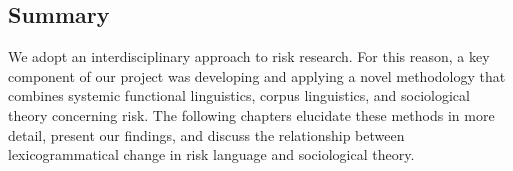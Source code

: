 \documentclass{report}
\begin{document}
\subsection{Summary}

We adopt an interdisciplinary approach to risk research. For this reason, a key component of our project was developing and applying a novel methodology that combines systemic functional linguistics, corpus linguistics, and sociological theory concerning risk. The following chapters elucidate these methods in more detail, present our findings, and discuss the relationship between lexicogrammatical change in risk language and sociological theory.











    \cleardoublepage
    \singlespacing
    \printendnotes
    \cleardoublepage
    \singlespacing
    
    
    \cleardoublepage

    
\end{document}
